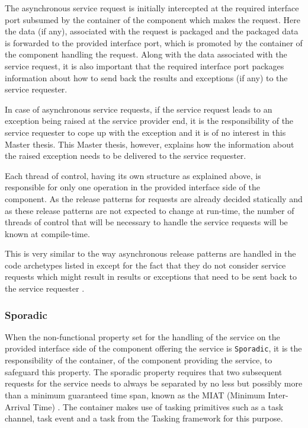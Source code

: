 The asynchronous service request is initially intercepted at the required interface port subsumed by the container of the component which makes the request. Here the data (if any), associated with the request is packaged and the packaged data is forwarded to the provided interface port, which is promoted by the container of the component handling the request. Along with the data associated with the service request, it is also important that the required interface port packages information about how to send back the results and exceptions (if any) to the service requester.

In case of asynchronous service requests, if the service request leads to an exception being raised at the service provider end, it is the responsibility of the service requester to cope up with the exception and it is of no interest in this Master thesis. This Master thesis, however, explains how the information about the raised exception needs to be delivered to the service requester. 

Each thread of control, having its own structure as explained above, is responsible for only one operation in the provided interface side of the component. As the release patterns for requests are already decided statically and as these release patterns are not expected to change at run-time, the number of threads of control that will be necessary to handle the service requests will be known at compile-time.

This is very similar to the way asynchronous release patterns are handled in the code archetypes listed in \cite{CharEvoRAVCodeAr}\cite{EvoRAVCodeAr} except for the fact that they do not consider service requests which might result in results or exceptions that need to be sent back to the service requester \cite{CharEvoRAVCodeAr}. 

\subsubsection{\textbf{Sporadic}}
When the non-functional property set for the handling of the service on the provided interface side of the component offering the service is \texttt{Sporadic}, it is the responsibility of the container, of the component providing the service, to safeguard this property. The sporadic property requires that two subsequent requests for the service needs to always be separated by no less but possibly more than a minimum guaranteed time span, known as the MIAT (Minimum Inter-Arrival Time) \cite{SpecMetamodel}\cite{CompBasedProcess}. The container makes use of tasking primitives such as a task channel, task event and a task from the Tasking framework for this purpose.

